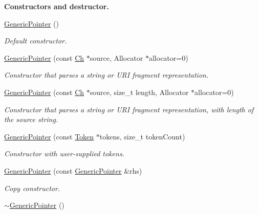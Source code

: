 \begin{Indent}{\bf Constructors and destructor.}\par
\begin{DoxyCompactItemize}
\item 
\hyperlink{class_generic_pointer_a7455896b98c559ac7842bfbe91d86c10}{Generic\+Pointer} ()\hypertarget{class_generic_pointer_a7455896b98c559ac7842bfbe91d86c10}{}\label{class_generic_pointer_a7455896b98c559ac7842bfbe91d86c10}

\begin{DoxyCompactList}\small\item\em Default constructor. \end{DoxyCompactList}\item 
\hyperlink{class_generic_pointer_a4ad549b8a826c3c2dedf03fcc07be9b0}{Generic\+Pointer} (const \hyperlink{class_generic_pointer_a38b73c84d37428340066d907f9d4f37f}{Ch} $\ast$source, Allocator $\ast$allocator=0)
\begin{DoxyCompactList}\small\item\em Constructor that parses a string or U\+RI fragment representation. \end{DoxyCompactList}\item 
\hyperlink{class_generic_pointer_a9c05684ea95306aac7626e70cb3946cc}{Generic\+Pointer} (const \hyperlink{class_generic_pointer_a38b73c84d37428340066d907f9d4f37f}{Ch} $\ast$source, size\+\_\+t length, Allocator $\ast$allocator=0)
\begin{DoxyCompactList}\small\item\em Constructor that parses a string or U\+RI fragment representation, with length of the source string. \end{DoxyCompactList}\item 
\hyperlink{class_generic_pointer_a524a9921eff68f389a817a20ca7f1d84}{Generic\+Pointer} (const \hyperlink{struct_generic_pointer_1_1_token}{Token} $\ast$tokens, size\+\_\+t token\+Count)
\begin{DoxyCompactList}\small\item\em Constructor with user-\/supplied tokens. \end{DoxyCompactList}\item 
\hyperlink{class_generic_pointer_a7803645e8f7f349ee09c7d50351e9432}{Generic\+Pointer} (const \hyperlink{class_generic_pointer}{Generic\+Pointer} \&rhs)\hypertarget{class_generic_pointer_a7803645e8f7f349ee09c7d50351e9432}{}\label{class_generic_pointer_a7803645e8f7f349ee09c7d50351e9432}

\begin{DoxyCompactList}\small\item\em Copy constructor. \end{DoxyCompactList}\item 
\hyperlink{class_generic_pointer_acf3eb2f7c4ebf9256f638aafa17534cb}{$\sim$\+Generic\+Pointer} ()\hypertarget{class_generic_pointer_acf3eb2f7c4ebf9256f638aafa17534cb}{}\label{class_generic_pointer_acf3eb2f7c4ebf9256f638aafa17534cb}


\end{DoxyCompactItemize}
\end{Indent}
